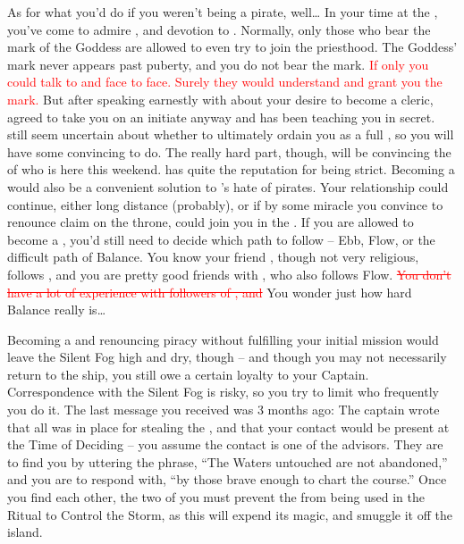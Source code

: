 \documentclass[char]{GL2020}
\begin{document}
As for what you'd do if you weren't being a pirate, well\ldots{} In your time at the \pSc{}, you've come to admire \cFlowPriest{\full}, and \cFlowPriest{\their} devotion to \cFlow{}. Normally, only those who bear the mark of the Goddess are allowed to even try to join the priesthood. The Goddess' mark never appears past puberty, and you do not bear the mark. \textcolor{red}{If only you could talk to \cEbb{} and \cFlow{} face to face. Surely they would understand and grant you the mark.} But after speaking earnestly with \cFlowPriest{} about your desire to become a cleric, \cFlowPriest{\they} agreed to take you on an initiate anyway and has been teaching you in secret. \cFlowPriest{\They} still seem\cFlowPriest{\plural} uncertain about whether to ultimately ordain you as a full \cPirate{\cleric}, so you will have some convincing to do. The really hard part, though, will be convincing the \cEbbPriest{\cleric} of \cEbb{} who is here this weekend. \cEbbPriest{\full} has quite the reputation for being strict. Becoming a \cPirate{\cleric} would also be a convenient solution to \cPrince{}'s hate of pirates. Your relationship could continue, either long distance (probably), or if by some miracle you convince \cPrince{} to renounce \cPrince{\their} claim on the throne, \cPrince{\they} could join you in the \pShip{}. If you are allowed to become a \cPirate{\cleric} , you'd still need to decide which path to follow -- Ebb, Flow, or the difficult path of Balance. You know your friend \cBunker{}, though not very religious, follows \textcolor{red}{\cEbb{}}, and you are pretty good friends with \cFlowPriest{}, who also follows Flow. \textcolor{red}{\sout{You don't have a lot of experience with followers of \cEbb{}, and}} You wonder just how hard Balance really is\ldots{}

Becoming a \cPirate{\cleric} and renouncing piracy without fulfilling your initial mission would leave the Silent Fog high and dry, though -- and though you may not necessarily return to the ship, you still owe a certain loyalty to your Captain. Correspondence with the Silent Fog is risky, so you try to limit who frequently you do it. The last message you received was 3 months ago: The captain wrote that all was in place for stealing the \iNet{}, and that your contact would be present at the Time of Deciding – you assume the contact is one of the advisors. They are to find you by uttering the phrase, ``The Waters untouched are not abandoned,'' and you are to respond with, ``by those brave enough to chart the course.'' Once you find each other, the two of you must prevent the \iNet{} from being used in the Ritual to Control the Storm, as this will expend its magic, and smuggle it off the island.
\end{document}
